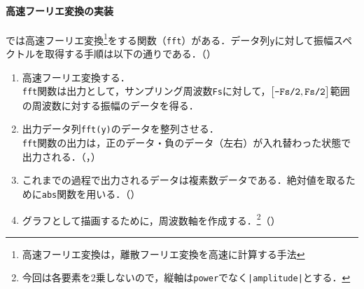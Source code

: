 \paragraph{高速フーリエ変換の実装}
\matlab では高速フーリエ変換\footnote{高速フーリエ変換は，離散フーリエ変換を高速に計算する手法}をする関数（\texttt{fft}）がある．データ列\texttt{y}に対して振幅スペクトルを取得する手順は以下の通りである．（）
\begin{enumerate}
    \item 高速フーリエ変換する．\\
          \texttt{fft}関数は出力として，サンプリング周波数\texttt{Fs}に対して，\(\big[\textrm{\texttt{-Fs/2}},\textrm{\texttt{Fs/2}}\big]\)範囲の周波数に対する振幅のデータを得る．
    \item 出力データ列\texttt{fft(y)}のデータを整列させる．\\
          \texttt{fft}関数の出力は，正のデータ・負のデータ（左右）が入れ替わった状態で出力される．（，）
    \item これまでの過程で出力されるデータは複素数データである．絶対値を取るために\texttt{abs}関数を用いる．（）
    \item グラフとして描画するために，周波数軸を作成する．\footnote{今回は各要素を2乗しないので，縦軸は\texttt{power}でなく\texttt{|amplitude|}とする．}（）
\end{enumerate}
